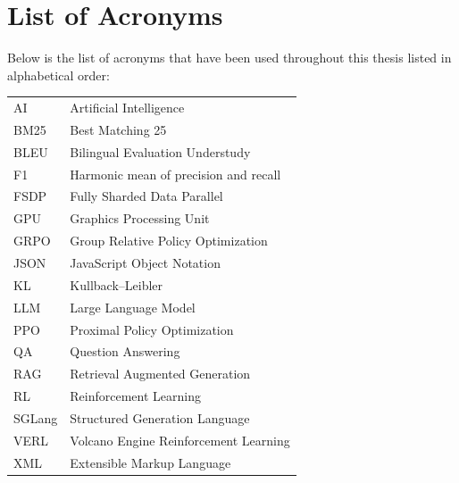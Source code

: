 \thispagestyle{plain}			%
\chapter*{List of Acronyms}
Below is the list of acronyms that have been used throughout this thesis listed in alphabetical order:
\vspace*{1.0cm}

\begin{tabular}{p{}p{}}
AI & Artificial Intelligence\\
BM25 & Best Matching 25\\
BLEU & Bilingual Evaluation Understudy\\
F1 & Harmonic mean of precision and recall\\
FSDP & Fully Sharded Data Parallel\\
GPU & Graphics Processing Unit\\
GRPO & Group Relative Policy Optimization\\
JSON & JavaScript Object Notation\\
KL & Kullback--Leibler\\
LLM & Large Language Model\\
PPO & Proximal Policy Optimization\\
QA & Question Answering\\
RAG & Retrieval Augmented Generation\\
RL & Reinforcement Learning\\
SGLang & Structured Generation Language\\
VERL & Volcano Engine Reinforcement Learning\\
XML & Extensible Markup Language\\
\end{tabular}


\newpage				%
\thispagestyle{empty}
\mbox{}
